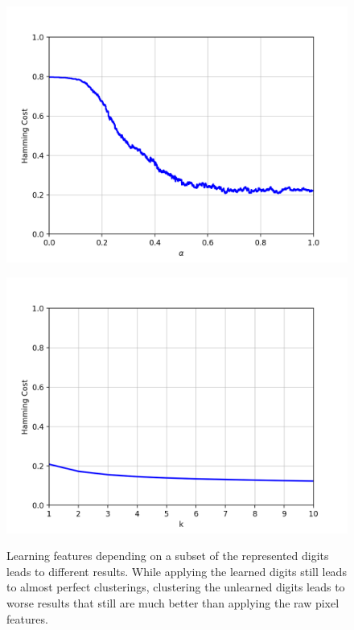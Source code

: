 \begin{figure}[H]
\begin{minipage}{.3\textwidth}
\end{minipage}\quad
\begin{minipage}{.3\textwidth}
  \centering
  {\includegraphics[width=\linewidth]{plots/mnist-cnn-sub-sc}}
\end{minipage}\quad
\begin{minipage}{.3\textwidth}
  \centering
  {\includegraphics[width=\linewidth]{plots/mnist-cnn-sub-sc-top10}}
\end{minipage}
\caption{Learning features depending on a subset of the represented digits leads to different results. While applying the learned digits still leads to almost perfect clusterings, clustering the unlearned digits leads to worse results that still are much better than applying the raw pixel features.}
\label{fig:mnist1000cnnsub}
\end{figure}

